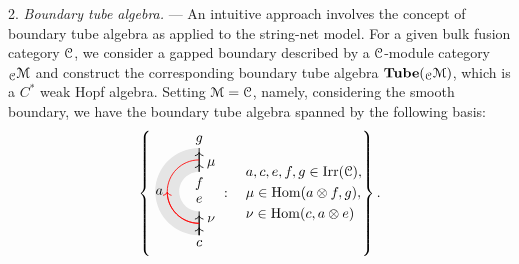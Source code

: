 \documentclass[a4paper,11pt]{article}
\theoremstyle{theorem}
\theoremstyle{remark}
\newcommand\eC           {\EuScript{C}}
\newcommand\eM          {\EuScript{M}}
\newcommand{\Irr}{\operatorname{Irr}}
\newcommand{\Hom}{\operatorname{Hom}}
\begin{document}
2. \emph{Boundary tube algebra.} --- An intuitive approach involves the concept of boundary tube algebra \cite{Kitaev2012boundary, bridgeman2023invertible, jia2024weakTube,jia2025weakhopftubealgebra} as applied to the string-net model. For a given bulk fusion category \( \eC \), we consider a gapped boundary described by a \( \eC \)-module category \( {_{\eC}}\eM \) and construct the corresponding boundary tube algebra \( \mathbf{Tube}({_{\eC}}\eM) \), which is a \( C^* \) weak Hopf algebra. Setting \( \eM = \eC \), namely, considering the smooth boundary, we have the boundary tube algebra spanned by the following basis:
\begin{equation} 
\left\{  
\begin{aligned}
    \begin{tikzpicture}
        \begin{scope}
            \fill[gray!20]
                (0,1.1) arc[start angle=90, end angle=270, radius=1.1] -- 
                (0,-0.5) arc[start angle=270, end angle=90, radius=0.5] -- cycle;
        \end{scope}
           \draw[line width=0.6pt,black,->] (0,0.5)--(0,0.7);
           \draw[line width=0.6pt,black,->] (0,0.7)--(0,1.0);
           \draw[line width=0.6pt,black] (0,0.5)--(0,1.1);
        \draw[line width=.6pt,black] (0,-0.5)--(0,-1.1);
        \draw[line width=0.6pt,black,->] (0,-1.1)--(0,-0.9);
        \draw[line width=0.6pt,black,->] (0,-1.1)--(0,-0.6);
        \draw[red, line width=0.6pt] (0,0.8) arc[start angle=90, end angle=270, radius=0.8];
           \draw[red, line width=0.6pt, ->] (0,-0.8) arc[start angle=270, end angle=180, radius=0.8];
        \node[line width=0.6pt, dashed, draw opacity=0.5] at (0,1.3) {$g$};
        \node[line width=0.6pt, dashed, draw opacity=0.5] at (0,-1.3) {$c$};
        \node[line width=0.6pt, dashed, draw opacity=0.5] at (-1,0) {$a$};
        \node[line width=0.6pt, dashed, draw opacity=0.5] at (0.3,-0.7) {$\nu$};
        \node[line width=0.6pt, dashed, draw opacity=0.5] at (0,-0.2) {$e$};
        \node[line width=0.6pt, dashed, draw opacity=0.5] at (0,0.2) {$f$};
        \node[line width=0.6pt, dashed, draw opacity=0.5] at (0.3,0.7) {$\mu$};
    \end{tikzpicture}
\end{aligned}
:\quad  \begin{aligned}
    &a,c,e,f,g\in \Irr(\eC),\\
    &\mu \in \Hom(a\otimes f,g),\\
    &\nu\in \Hom(c,a\otimes e) 
\end{aligned}
\right\}.
\label{eq:tubebasis}
\end{equation}
\end{document}
